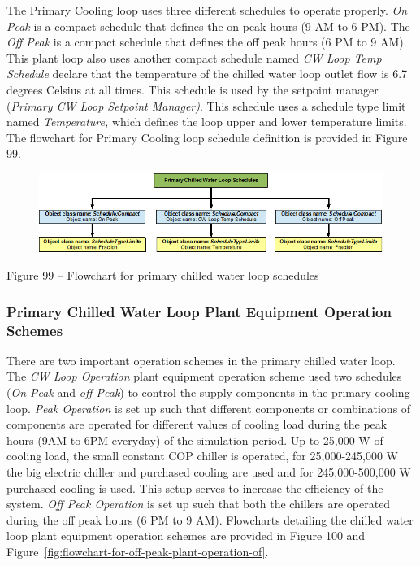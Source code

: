 The Primary Cooling loop uses three different schedules to operate properly. \emph{On Peak} is a compact schedule that defines the on peak hours (9 AM to 6 PM). The \emph{Off Peak} is a compact schedule that defines the off peak hours (6 PM to 9 AM). This plant loop also uses another compact schedule named \emph{CW Loop Temp Schedule} declare that the temperature of the chilled water loop outlet flow is 6.7 degrees Celsius at all times. This schedule is used by the setpoint manager (\emph{Primary CW Loop Setpoint Manager)}. This schedule uses a schedule type limit named \emph{Temperature,} which defines the loop upper and lower temperature limits. The flowchart for Primary Cooling loop schedule definition is provided in Figure 99.

\begin{figure}[htbp]
\centering
\includegraphics{media/image099.png}
\caption{}
\end{figure}

Figure 99 -- Flowchart for primary chilled water loop schedules

\subsubsection{Primary Chilled Water Loop Plant Equipment Operation Schemes}\label{primary-chilled-water-loop-plant-equipment-operation-schemes}

There are two important operation schemes in the primary chilled water loop. The \emph{CW Loop Operation} plant equipment operation scheme used two schedules (\emph{On Peak} and \emph{off Peak}) to control the supply components in the primary cooling loop. \emph{Peak Operation} is set up such that different components or combinations of components are operated for different values of cooling load during the peak hours (9AM to 6PM everyday) of the simulation period. Up to 25,000 W of cooling load, the small constant COP chiller is operated, for 25,000-245,000 W the big electric chiller and purchased cooling are used and for 245,000-500,000 W purchased cooling is used. This setup serves to increase the efficiency of the system. \emph{Off Peak Operation} is set up such that both the chillers are operated during the off peak hours (6 PM to 9 AM). Flowcharts detailing the chilled water loop plant equipment operation schemes are provided in Figure 100 and Figure~\ref{fig:flowchart-for-off-peak-plant-operation-of}.

